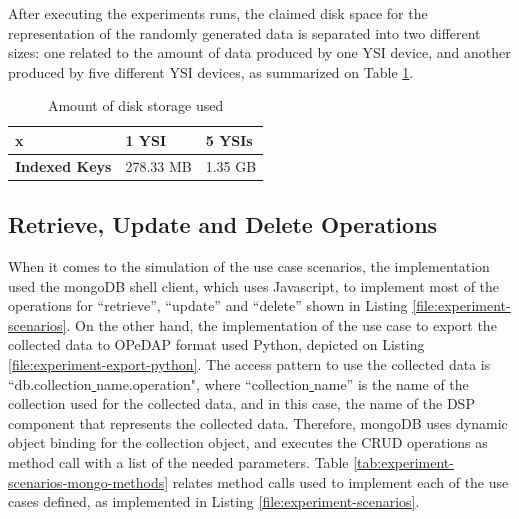 After executing the experiments runs, the claimed disk space for
the representation of the randomly generated data is separated into two
different sizes: one related to the amount of data produced by one YSI device,
and another produced by five different YSI devices, as summarized on Table
\ref{tab:experiment-insert-diskspace}.

\begin{table}
    \begin{center}
        \begin{tabular}{|p{100pt}|p{100pt}|p{100pt}|}\hline
        x & \textbf{1 YSI} & \textbf{5 YSIs}\\\hline
        \textbf{Indexed Keys} & 278.33 MB & 1.35 GB \\\hline
        \end{tabular}
        \caption{Amount of disk storage used}
    \end{center}
    \label{tab:experiment-insert-diskspace}
\end{table}

\subsection{Retrieve, Update and Delete Operations}

When it comes to the simulation of the use case scenarios, the implementation
used the mongoDB shell client, which uses Javascript, to implement most of the
operations for ``retrieve'', ``update'' and ``delete'' shown in Listing
\ref{file:experiment-scenarios}. On the other hand, the implementation of the
use case to export the collected data to OPeDAP format used Python, depicted on
Listing \ref{file:experiment-export-python}. The access pattern to use the
collected data is ``db.collection\underline{ }name.operation", where
``collection\underline{ }name'' is the name of the collection used for the
collected data, and in this case, the name of the DSP component that represents
the collected data. Therefore, mongoDB uses dynamic object binding for the
collection object, and executes the CRUD operations as method call with a list
of the needed parameters. Table \ref{tab:experiment-scenarios-mongo-methods}
relates method calls used to implement each of the use cases defined, as
implemented in Listing \ref{file:experiment-scenarios}.

